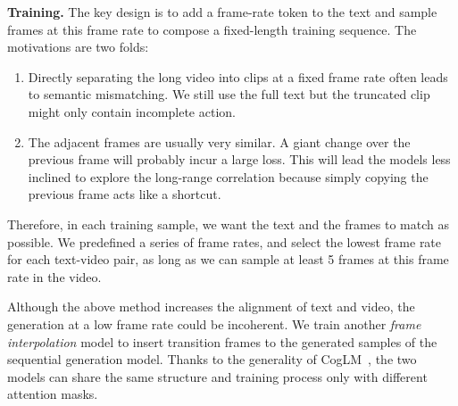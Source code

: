 \textbf{Training. }The key design is to add a frame-rate token to the text and sample frames at this frame rate to compose a fixed-length training sequence. The motivations are two folds: 
\begin{enumerate}[(1)]
    \item Directly separating the long video into clips at a fixed frame rate often leads to semantic mismatching. We still use the full text but the truncated clip might only contain incomplete action. 
    \item The adjacent frames are usually very similar. A giant change over the previous frame will probably incur a large loss.  This will lead the models less inclined to explore the long-range correlation because simply copying the previous frame acts like a shortcut.
\end{enumerate}

Therefore, in each training sample, we want the text and the frames to match as possible. We predefined a series of frame rates, and select the lowest frame rate for each text-video pair, as long as we can sample at least 5 frames at this frame rate in the video.

Although the above method increases the alignment of text and video, the generation at a low frame rate could be incoherent. We train another \emph{frame interpolation} model to insert transition frames to the generated samples of the sequential generation model. Thanks to the generality of CogLM~\cite{ding2022cogview2}, the two models can share the same structure and training process only with different attention masks. 

